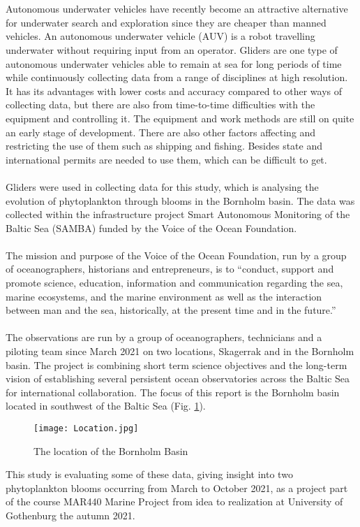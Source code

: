 \documentclass[../Main.tex]{subfiles}
\begin{document}
\ \\ \ \\
Autonomous underwater vehicles have recently become an attractive alternative for underwater search and exploration since they are cheaper than manned vehicles. 
An autonomous underwater vehicle (AUV) is a robot travelling underwater without requiring input from an operator.
Gliders are one type of autonomous underwater vehicles able to remain at sea for long periods of time while continuously collecting data from a range of disciplines at high resolution. 
It has its advantages with lower costs and accuracy compared to other ways of collecting data, but there are also from time-to-time difficulties with the equipment and controlling it. 
The equipment and work methods are still on quite an early stage of development. 
There are also other factors affecting and restricting the use of them such as shipping and fishing. 
Besides state and international permits are needed to use them, which can be difficult to get. 
\ \\ \ \\
Gliders were used in collecting data for this study, which is analysing the evolution of phytoplankton through blooms in the Bornholm basin. 
The data was collected within the infrastructure project Smart Autonomous Monitoring of the Baltic Sea (SAMBA) funded by the Voice of the Ocean Foundation.
\ \\ \ \\
The mission and purpose of the Voice of the Ocean Foundation, run by a group of oceanographers, historians and entrepreneurs, is to “conduct, support and promote science, education, information and communication regarding the sea, marine ecosystems, and the marine environment as well as the interaction between man and the sea, historically, at the present time and in the future.”\supercite{VOTO2021} 
\ \\ \ \\
The observations are run by a group of oceanographers, technicians and a piloting team since March 2021 on two locations, Skagerrak and in the Bornholm basin. 
The project is combining short term science objectives and the long-term vision of establishing several persistent ocean observatories across the Baltic Sea for international collaboration.
The focus of this report is the Bornholm basin located in southwest of the Baltic Sea (Fig. \ref{fig:loc}).
\begin{figure}[H]
\texttt{[image: Location.jpg]}
\caption{The location of the Bornholm Basin}
\label{fig:loc}
\end{figure}
This study is evaluating some of these data, giving insight into two phytoplankton blooms occurring from March to October 2021, as a project part of the course MAR440 Marine Project from idea to realization at University of Gothenburg the autumn 2021.
\end{document}
